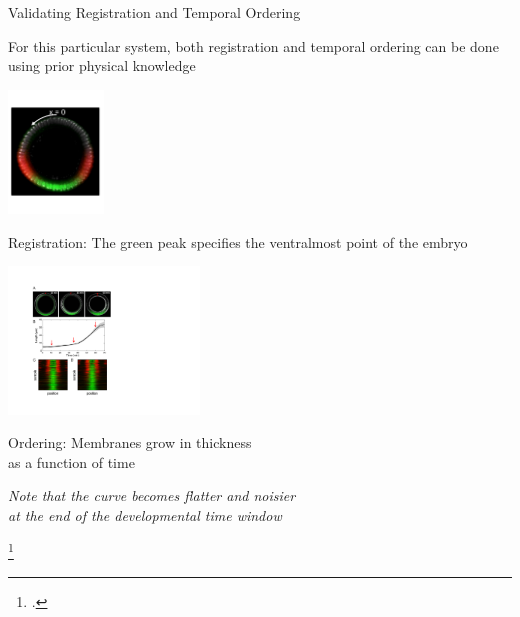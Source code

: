 \documentclass[10pt]{beamer}
\begin{document}
\begin{frame}{Validating Registration and Temporal Ordering}

\centering
For this particular system, both registration and temporal ordering can be done using prior physical knowledge 

\vspace{0.1in}

\begin{minipage}{0.35\textwidth}
\begin{center}
\includegraphics[width=1in]{one_embryo}

{\small 
\textcolor{bold}{Registration:} The green peak specifies the ventralmost point of the embryo

\par}

\end{center}
\end{minipage}
\hfill
\begin{minipage}{0.6\textwidth}

\begin{center}
\includegraphics[width=2in, trim=0in 2.2in 0in 0in, clip]{fig6}

{\small 
\textcolor{bold}{Ordering:} 
Membranes grow in thickness \\as a function of time \footnotemark \par}

{\em \scriptsize Note that the curve becomes flatter and noisier \\at the end of the developmental time window \par}

\end{center}
\end{minipage}

\footcitetext{figard2013plasma}

\end{frame}
\end{document}
